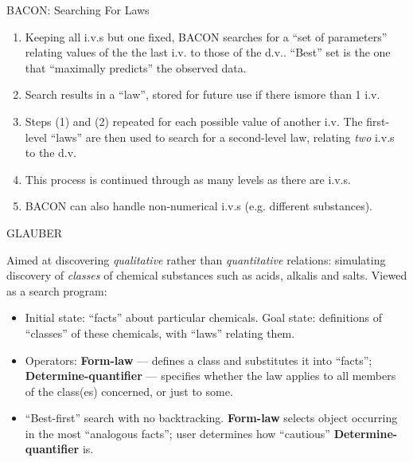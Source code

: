 \documentclass{article}
\begin{document}
\begin{slide}{}
{\Large BACON: Searching For Laws}
\begin{enumerate}
\item Keeping all i.v.s but one fixed, BACON searches for a ``set of
parameters'' relating values of the the last i.v. to those of the
d.v.. ``Best'' set is the one that ``maximally predicts'' the
observed data. 
\item  Search results in a ``law'', stored for future use if there
ismore than 1 i.v.
\item Steps (1) and (2) repeated for each possible value of another
i.v. The first-level ``laws'' are then used to search for
a second-level law, relating {\em two} i.v.s to the d.v.
\item This process is continued through as many levels as there are
i.v.s.
\item BACON can also handle non-numerical i.v.s (e.g. different substances).
\end{enumerate}
\end{slide}

\begin{slide}{}
{\Large GLAUBER}

Aimed at discovering {\em qualitative} rather than {\em
quantitative} relations: simulating discovery of {\em classes} of chemical
substances such as acids, alkalis and salts. Viewed as a search program:
\begin{itemize}
\item Initial state: ``facts'' about particular chemicals. Goal state:
definitions of ``classes'' of these chemicals, with ``laws'' relating them.
\item Operators: {\bf Form-law} --- defines a class and substitutes it
into ``facts''; {\bf Determine-quantifier} --- specifies whether the
law applies to all members of the class(es) concerned, or just to
some.
\item ``Best-first'' search with no backtracking. {\bf Form-law}
selects object occurring in the most ``analogous facts''; user
determines how ``cautious'' {\bf Determine-quantifier} is.
\end{itemize}
\end{slide}
\end{document}
